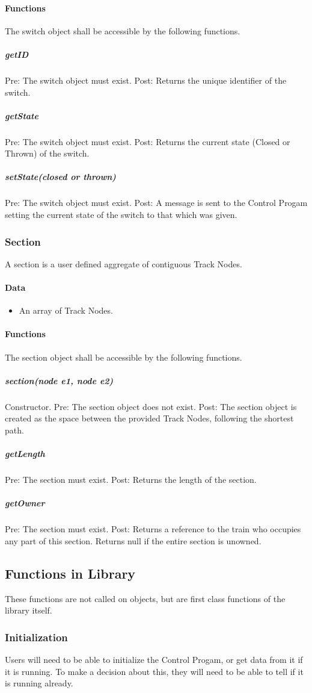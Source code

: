 \documentclass[a4paper,11pt,notitlepage]{article}
\def\CS{Control Progam\xspace}
\def\TN{Track Node\xspace}
\begin{document}
\paragraph{Functions}
The switch object shall be accessible by the following functions.
\subparagraph{getID} Pre: The switch object must exist. Post: Returns the unique identifier of the switch.
\subparagraph{getState} Pre: The switch object must exist. Post: Returns the current state (Closed or Thrown) of the switch.
\subparagraph{setState(closed or thrown)} Pre: The switch object must exist. Post: A message is sent to the \CS setting the current state of the switch to that which was given.

\subsubsection{Section}
A section is a user defined aggregate of contiguous \TN{}s.
\paragraph{Data}
\begin{itemize}
\item An array of \TN{}s.
\end{itemize}
\paragraph{Functions}
The section object shall be accessible by the following functions.
\subparagraph{section(node e1, node e2)} Constructor. Pre: The section object does not exist. Post: The section object is created as the space between the provided \TN{}s, following the shortest path.
\subparagraph{getLength} Pre: The section must exist. Post: Returns the length of the section.
\subparagraph{getOwner} Pre: The section must exist. Post: Returns a reference to the train who occupies any part of this section. Returns null if the entire section is unowned.

\subsection{Functions in Library}
These functions are not called on objects, but are first class functions of the library itself.
\subsubsection{Initialization}
Users will need to be able to initialize the \CS, or get data from it if it is running. To make a decision about this, they will need to be able to tell if it is running already.
\end{document}

